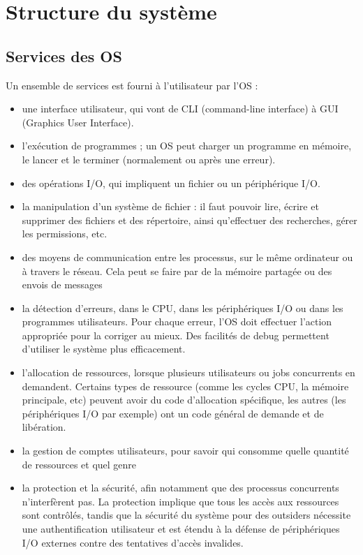 \chapter{Structure du système}

\section{Services des OS}

Un ensemble de services est fourni à l'utilisateur par l'OS :

\begin{itemize}
	\item une interface utilisateur, qui vont de CLI (command-line interface) à GUI (Graphics User Interface).
	\item l'exécution de programmes ; un OS peut charger un programme en mémoire, le lancer et le terminer (normalement ou après une erreur).
	\item des opérations I/O, qui impliquent un fichier ou un périphérique I/O.
	\item la manipulation d'un système de fichier : il faut pouvoir lire, écrire et supprimer des fichiers et des répertoire, ainsi qu'effectuer des recherches, gérer les permissions, etc.
	\item des moyens de communication entre les processus, sur le même ordinateur ou à travers le réseau. Cela peut se faire par de la mémoire partagée ou des envois de messages
	\item la détection d'erreurs, dans le CPU, dans les périphériques I/O ou dans les programmes utilisateurs. Pour chaque erreur, l'OS doit effectuer l'action appropriée pour la corriger au mieux. Des facilités de debug permettent d'utiliser le système plus efficacement.
	
	\item l'allocation de ressources, lorsque plusieurs utilisateurs ou jobs concurrents en demandent. Certains types de ressource (comme les cycles CPU, la mémoire principale, etc) peuvent avoir du code d'allocation spécifique, les autres (les périphériques I/O par exemple) ont un code général de demande et de libération.
	\item la gestion de comptes utilisateurs, pour savoir qui consomme quelle quantité de ressources et quel genre
	\item la protection et la sécurité, afin notamment que des processus concurrents n'interfèrent pas. La protection implique que tous les accès aux ressources sont contrôlés, tandis que la sécurité du système pour des outsiders nécessite une authentification utilisateur et est étendu à la défense de périphériques I/O externes contre des tentatives d'accès invalides.
\end{itemize}

